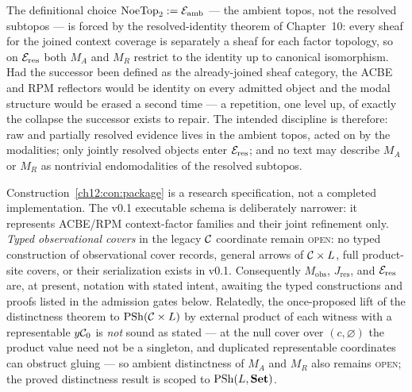 The definitional choice $\mathrm{NoeTop}_2 := \mathcal{E}_{\mathrm{amb}}$ --- the ambient topos,
not the resolved subtopos --- is forced by the resolved-identity theorem of
Chapter~10: every sheaf for the joined context coverage is separately a
sheaf for each factor topology, so on $\mathcal{E}_{\mathrm{res}}$ both $M_A$ and $M_R$ restrict
to the identity up to canonical isomorphism. Had the successor been defined
as the already-joined sheaf category, the ACBE and RPM reflectors would be
identity on every admitted object and the modal structure would be erased a
second time --- a repetition, one level up, of exactly the collapse the
successor exists to repair. The intended discipline is therefore: raw and
partially resolved evidence lives in the ambient topos, acted on by the
modalities; only jointly resolved objects enter $\mathcal{E}_{\mathrm{res}}$; and no text may
describe $M_A$ or $M_R$ as nontrivial endomodalities of the resolved
subtopos.

\begin{boundary}
\label{ch12:bnd:schema}
Construction~\ref{ch12:con:package} is a research specification, not a
completed implementation. The v0.1 executable schema is deliberately
narrower: it represents ACBE/RPM context-factor families and their joint
refinement only. \emph{Typed observational covers} in the legacy $\mathcal{C}$
coordinate remain \textsc{open}: no typed construction of observational
cover records, general arrows of $\mathcal{C} \times L$, full product-site covers,
or their serialization exists in v0.1. Consequently $M_{\mathrm{obs}}$,
$J_{\mathrm{res}}$, and $\mathcal{E}_{\mathrm{res}}$ are, at present, notation with stated
intent, awaiting the typed constructions and proofs listed in the admission
gates below. Relatedly, the once-proposed lift of the distinctness theorem
to $\mathrm{PSh}(\mathcal{C} \times L)$ by external product of each witness with a
representable $y\mathcal{C}_0$ is \emph{not} sound as stated --- at the null cover
over $(c, \varnothing)$ the product value need not be a singleton, and
duplicated representable coordinates can obstruct gluing --- so ambient
distinctness of $M_A$ and $M_R$ also remains \textsc{open}; the proved
distinctness result is scoped to $\mathrm{PSh}(L, \mathbf{Set})$.
\end{boundary}

